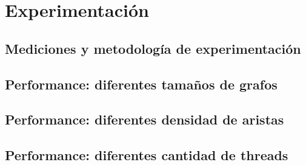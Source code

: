 \section{Experimentación}
\subsection{Mediciones y metodología de experimentación}

\subsection{Performance: diferentes tamaños de grafos}

\subsection{Performance: diferentes densidad de aristas}

\subsection{Performance: diferentes cantidad de threads}

